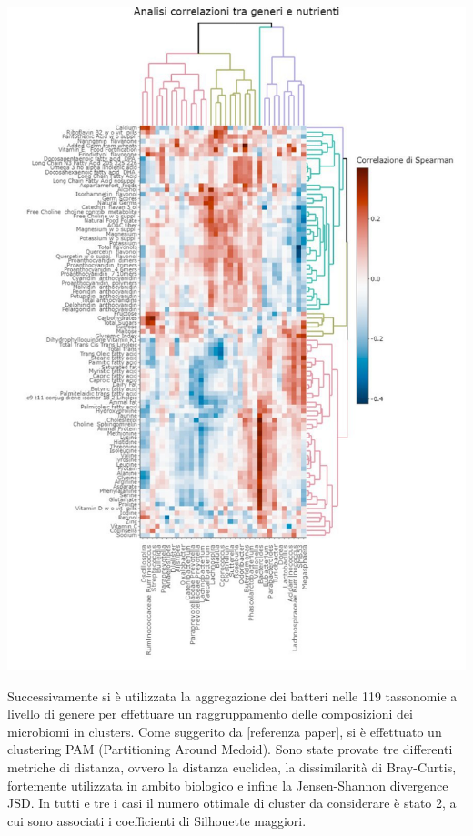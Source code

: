 \begin{Figure}
    \centering
    \includegraphics[width=\linewidth,keepaspectratio]{images/real_correlazione.jpeg}
  \end{Figure}

Successivamente si è utilizzata la aggregazione dei batteri nelle 119 tassonomie a livello di genere per effettuare un raggruppamento delle composizioni dei microbiomi in clusters. Come suggerito da [referenza paper], si è effettuato un clustering PAM (Partitioning Around Medoid).
Sono state provate tre differenti metriche di distanza, ovvero la distanza euclidea, la dissimilarità di Bray-Curtis, fortemente utilizzata in ambito biologico e infine la Jensen-Shannon divergence JSD. In tutti e tre i casi il numero ottimale di cluster da considerare è stato 2, a cui sono associati i coefficienti di Silhouette maggiori. 

